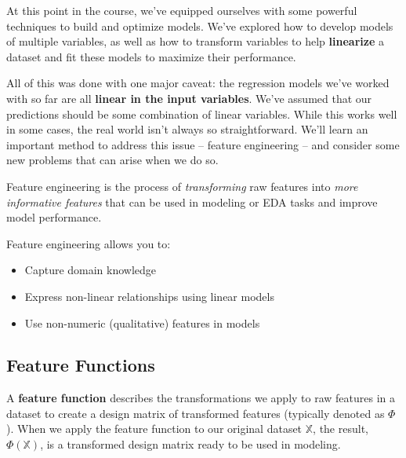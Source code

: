 \documentclass[
  letterpaper,
  DIV=11,
  numbers=noendperiod]{scrreprt}
\providecommand{\tightlist}{%
  \setlength{\itemsep}{0pt}\setlength{\parskip}{0pt}}\usepackage{longtable,booktabs,array}
\begin{document}
\begin{tcolorbox}[enhanced jigsaw, arc=.35mm, left=2mm, toprule=.15mm, leftrule=.75mm, bottomrule=.15mm, colframe=quarto-callout-tip-color-frame, rightrule=.15mm, colbacktitle=quarto-callout-tip-color!10!white, opacitybacktitle=0.6, coltitle=black, bottomtitle=1mm, colback=white, toptitle=1mm, title=\textcolor{quarto-callout-tip-color}{\faLightbulb}\hspace{0.5em}{Motivation}, breakable, opacityback=0, titlerule=0mm]

At this point in the course, we've equipped ourselves with some powerful
techniques to build and optimize models. We've explored how to develop
models of multiple variables, as well as how to transform variables to
help \textbf{linearize} a dataset and fit these models to maximize their
performance.

All of this was done with one major caveat: the regression models we've
worked with so far are all \textbf{linear in the input variables}. We've
assumed that our predictions should be some combination of linear
variables. While this works well in some cases, the real world isn't
always so straightforward. We'll learn an important method to address
this issue -- feature engineering -- and consider some new problems that
can arise when we do so.

\end{tcolorbox}

Feature engineering is the process of \emph{transforming} raw features
into \emph{more informative features} that can be used in modeling or
EDA tasks and improve model performance.

Feature engineering allows you to:

\begin{itemize}
\tightlist
\item
  Capture domain knowledge
\item
  Express non-linear relationships using linear models
\item
  Use non-numeric (qualitative) features in models
\end{itemize}

\subsection{Feature Functions}\label{feature-functions}

A \textbf{feature function} describes the transformations we apply to
raw features in a dataset to create a design matrix of transformed
features (typically denoted as \(\Phi\)). When we apply the feature
function to our original dataset \(\mathbb{X}\), the result,
\(\Phi(\mathbb{X})\), is a transformed design matrix ready to be used in
modeling.
\end{document}
